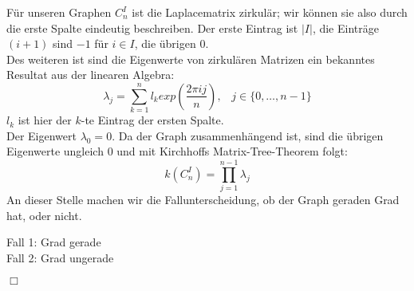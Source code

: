 Für unseren Graphen $C_n^I$ ist die Laplacematrix zirkulär; wir können sie also durch die erste Spalte eindeutig beschreiben. Der erste Eintrag ist $|I|$, die Einträge $(i+1)$ sind $-1$ für $i \in I$, die übrigen $0$.\\
Des weiteren ist sind die Eigenwerte von zirkulären Matrizen ein bekanntes Resultat aus der linearen Algebra:
\begin{equation}
 \lambda_j = \sum_{k=1}^{n}l_kexp\left(\frac{2\pi ij}{n}\right), \,\,\,\,\, {j\in\{0,\ldots,n-1\}}
\end{equation}
$l_k$ ist hier der $k$-te Eintrag der ersten Spalte.\\ 
Der Eigenwert $\lambda_0 = 0$. Da der Graph zusammenhängend ist, sind die übrigen Eigenwerte ungleich $0$ und mit Kirchhoffs Matrix-Tree-Theorem folgt:
\begin{equation}
 \mathit{k}(C_n^I)=\prod_{j=1}^{n-1} \lambda_j
\end{equation}
An dieser Stelle machen wir die Fallunterscheidung, ob der Graph geraden Grad hat, oder nicht.\\
\par %
\begingroup
\leftskip=20pt%
\rightskip=20pt
\noindent
Fall 1: Grad gerade\\
Fall 2: Grad ungerade
\par
\endgroup
{}
\begin{flushright} $\Box$ \end{flushright} 
\begin{Bsps}
\end{Bsps} 
